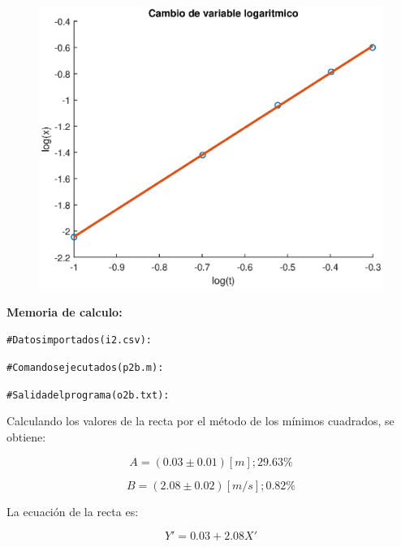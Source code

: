\documentclass[letter,11pt]{article}
\begin{document}
\begin{enumerate}
    \begin{figure}[!h]
    \centering
    \includegraphics[scale=0.75]{resources/g2b.eps}
    \end{figure}

    \textbf{Memoria de calculo:}
    \begin{shaded}
        \begin{alltt}
            \footnotesize
\# Datos importados (i2.csv):


\# Comandos ejecutados (p2b.m):


\# Salida del programa (o2b.txt):

            \normalsize
        \end{alltt}
    \end{shaded}

    Calculando los valores de la recta por el método de los mínimos cuadrados,
    se obtiene:

    \begin{equation*}
        A = (0.03 \pm 0.01)[m];29.63\%
    \end{equation*}

    \begin{equation*}
        B = (2.08 \pm 0.02)[m/s];0.82\%
    \end{equation*}

    La ecuación de la recta es:

    \begin{equation*}
        Y' = 0.03 + 2.08 X'
    \end{equation*}


\end{enumerate}
\end{document}
